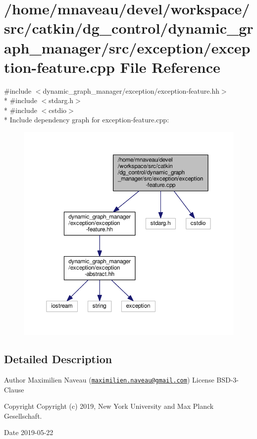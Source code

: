 \hypertarget{exception-feature_8cpp}{}\section{/home/mnaveau/devel/workspace/src/catkin/dg\+\_\+control/dynamic\+\_\+graph\+\_\+manager/src/exception/exception-\/feature.cpp File Reference}
\label{exception-feature_8cpp}
{\ttfamily \#include $<$dynamic\+\_\+graph\+\_\+manager/exception/exception-\/feature.\+hh$>$}\\*
{\ttfamily \#include $<$stdarg.\+h$>$}\\*
{\ttfamily \#include $<$cstdio$>$}\\*
Include dependency graph for exception-\/feature.cpp\+:\nopagebreak
\begin{figure}[H]
\begin{center}
\leavevmode
\includegraphics[width=350pt]{exception-feature_8cpp__incl}
\end{center}
\end{figure}


\subsection{Detailed Description}
\begin{DoxyAuthor}{Author}
Maximilien Naveau (\href{mailto:maximilien.naveau@gmail.com}{\tt maximilien.\+naveau@gmail.\+com})  License B\+S\+D-\/3-\/\+Clause 
\end{DoxyAuthor}
\begin{DoxyCopyright}{Copyright}
Copyright (c) 2019, New York University and Max Planck Gesellschaft. 
\end{DoxyCopyright}
\begin{DoxyDate}{Date}
2019-\/05-\/22 
\end{DoxyDate}
